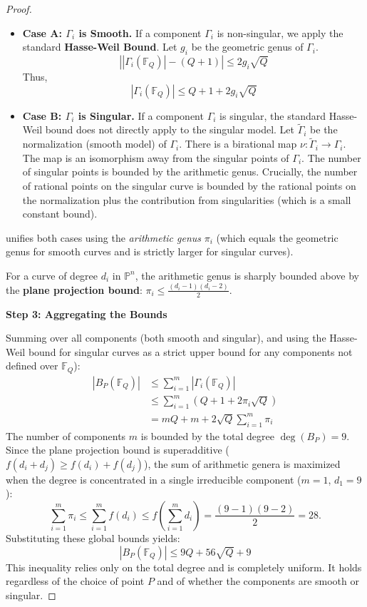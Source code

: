 \documentclass[11pt]{article}
\theoremstyle{definition}
\newcommand{\FF}{\mathbb{F}}
\newcommand{\PP}{\mathbb{P}}
\begin{document}
\begin{proof}
\begin{itemize}
    \item \textbf{Case A: $\Gamma_i$ is Smooth.}
If a component $\Gamma_i$ is non-singular, we apply the standard \textbf{Hasse-Weil Bound}.
Let $g_i$ be the geometric genus of $\Gamma_i$.
\[ \left| |\Gamma_i(\FF_Q)| - (Q+1) \right| \le 2g_i \sqrt{Q} \]
Thus,
\[ |\Gamma_i(\FF_Q)| \le Q + 1 + 2g_i \sqrt{Q} \]
    \item \textbf{Case B: $\Gamma_i$ is Singular.}
If a component $\Gamma_i$ is singular, the standard Hasse-Weil bound does not directly apply to the singular model. Let $\tilde{\Gamma}_i$ be the normalization (smooth model) of $\Gamma_i$. There is a birational map $\nu: \tilde{\Gamma}_i \to \Gamma_i$.
The map is an isomorphism away from the singular points of $\Gamma_i$. The number of singular points is bounded by the arithmetic genus.
Crucially, the number of rational points on the singular curve is bounded by the rational points on the normalization plus the contribution from singularities (which is a small constant bound).
\end{itemize}

 unifies both cases using the \textit{arithmetic genus} $\pi_i$ (which equals the geometric genus for smooth curves and is strictly larger for singular curves).

For a curve of degree $d_i$ in $\PP^n$, the arithmetic genus is sharply bounded above by the \textbf{plane projection bound}: $\pi_i \le \frac{(d_i-1)(d_i-2)}{2}$.

\vspace{0.5em}
\noindent\textbf{Step 3: Aggregating the Bounds}

Summing over all components (both smooth and singular), and using the Hasse-Weil bound for singular curves as a strict upper bound for any components not defined over $\FF_Q$):
\begin{align*}
    |B_P(\FF_Q)| &\le \sum_{i=1}^m |\Gamma_i(\FF_Q)| \\
    &\le \sum_{i=1}^m \left( Q + 1 + 2\pi_i \sqrt{Q} \right) \\
    &= mQ + m + 2\sqrt{Q} \sum_{i=1}^m \pi_i
\end{align*}
The number of components $m$ is bounded by the total degree $\deg(B_P) = 9$. Since the plane projection bound is superadditive ($f(d_i+d_j) \ge f(d_i) + f(d_j)$), the sum of arithmetic genera is maximized when the degree is concentrated in a single irreducible component ($m = 1$, $d_1 = 9$):
\[ \sum_{i=1}^m \pi_i  \le \sum_{i=1}^m f(d_i) \le f\left(\sum_{i=1}^m d_i\right) = \frac{(9-1)(9-2)}{2} = 28. \]
Substituting these global bounds yields:
\[ |B_P(\FF_Q)| \le 9Q + 56\sqrt{Q} + 9 \]
This inequality relies only on the total degree and is completely uniform. It holds regardless of the choice of point $P$ and of whether the components are smooth or singular.


\end{proof}
\end{document}
